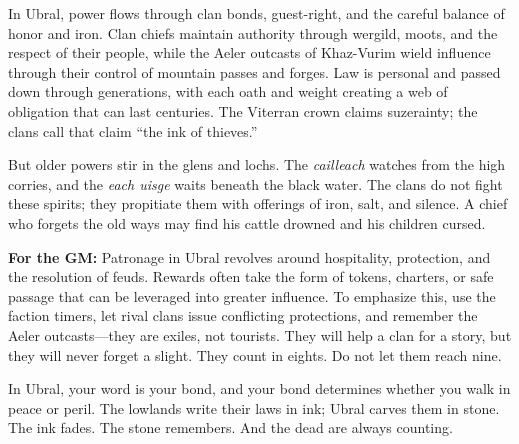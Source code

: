 \begin{tcolorbox}[colback=black!3,colframe=black!40!white,title={Patronage \& Power},breakable]
In Ubral, power flows through clan bonds, guest-right, and the careful balance of honor and iron. Clan chiefs maintain authority through wergild, moots, and the respect of their people, while the Aeler outcasts of Khaz-Vurim wield influence through their control of mountain passes and forges. Law is personal and passed down through generations, with each oath and weight creating a web of obligation that can last centuries. The Viterran crown claims suzerainty; the clans call that claim ``the ink of thieves.''

But older powers stir in the glens and lochs. The \textit{cailleach} watches from the high corries, and the \textit{each uisge} waits beneath the black water. The clans do not fight these spirits; they propitiate them with offerings of iron, salt, and silence. A chief who forgets the old ways may find his cattle drowned and his children cursed.

\textbf{For the GM:}  
Patronage in Ubral revolves around hospitality, protection, and the resolution of feuds. Rewards often take the form of tokens, charters, or safe passage that can be leveraged into greater influence. To emphasize this, use the faction timers, let rival clans issue conflicting protections, and remember the Aeler outcasts---they are exiles, not tourists. They will help a clan for a story, but they will never forget a slight. They count in eights. Do not let them reach nine.

In Ubral, your word is your bond, and your bond determines whether you walk in peace or peril. The lowlands write their laws in ink; Ubral carves them in stone. The ink fades. The stone remembers. And the dead are always counting.
\end{tcolorbox}

